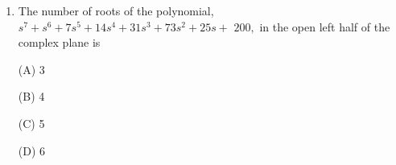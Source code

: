 \documentclass[journal,12pt,twocolumn]{IEEEtran}
\renewcommand\thesection{\arabic{section}}
\begin{document}
\begin{enumerate}[label=\arabic*.,ref=\thesection.\theenumi]
%
%
%
%
\item
The number of roots of the polynomial, $s^{7}+s^{6}+7 s^{5}+14 s^{4}+31s^{3}+73 s^{2}+25 s+$ $200,$ in the open left half of the complex plane is

(A) 3

(B) 4

(C) 5

(D) 6


\end{enumerate}
\end{document}
